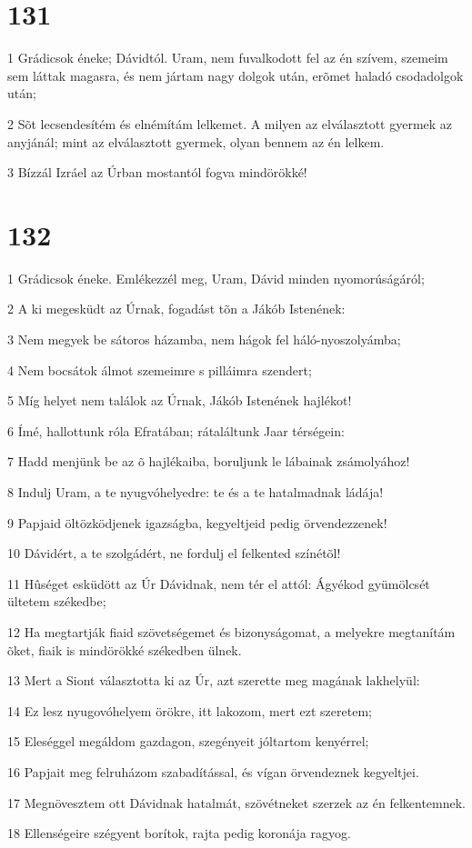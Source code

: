 \chapter{131}

\par 1 Grádicsok éneke; Dávidtól. Uram, nem fuvalkodott fel az én szívem, szemeim sem láttak magasra, és nem jártam nagy dolgok után, erõmet haladó csodadolgok után;
\par 2 Sõt lecsendesítém és elnémítám lelkemet. A milyen az elválasztott gyermek az anyjánál; mint az elválasztott gyermek, olyan bennem az én lelkem.
\par 3 Bízzál Izráel az Úrban mostantól fogva mindörökké!

\chapter{132}

\par 1 Grádicsok éneke. Emlékezzél meg, Uram, Dávid minden nyomorúságáról;
\par 2 A ki megesküdt az Úrnak, fogadást tõn a Jákób Istenének:
\par 3 Nem megyek be sátoros házamba, nem hágok fel háló-nyoszolyámba;
\par 4 Nem bocsátok álmot szemeimre s pilláimra szendert;
\par 5 Míg helyet nem találok az Úrnak, Jákób Istenének hajlékot!
\par 6 Ímé, hallottunk róla Efratában; rátaláltunk Jaar térségein:
\par 7 Hadd menjünk be az õ hajlékaiba, boruljunk le lábainak zsámolyához!
\par 8 Indulj Uram, a te nyugvóhelyedre: te és a te hatalmadnak ládája!
\par 9 Papjaid öltözködjenek igazságba, kegyeltjeid pedig örvendezzenek!
\par 10 Dávidért, a te szolgádért, ne fordulj el felkented színétõl!
\par 11 Hûséget esküdött az Úr Dávidnak, nem tér el attól: Ágyékod gyümölcsét ültetem székedbe;
\par 12 Ha megtartják fiaid szövetségemet és bizonyságomat, a melyekre megtanítám õket, fiaik is mindörökké székedben ülnek.
\par 13 Mert a Siont választotta ki az Úr, azt szerette meg magának lakhelyül:
\par 14 Ez lesz nyugovóhelyem örökre, itt lakozom, mert ezt szeretem;
\par 15 Eleséggel megáldom gazdagon, szegényeit jóltartom kenyérrel;
\par 16 Papjait meg felruházom szabadítással, és vígan örvendeznek kegyeltjei.
\par 17 Megnövesztem ott Dávidnak hatalmát, szövétneket szerzek az én felkentemnek.
\par 18 Ellenségeire szégyent borítok, rajta pedig koronája ragyog.

